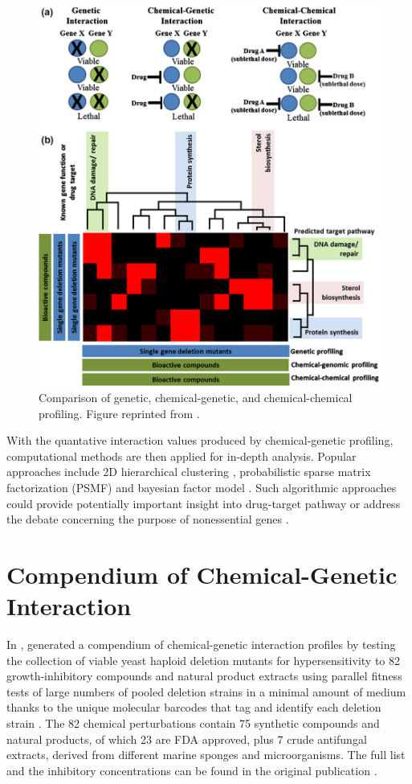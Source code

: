 \documentclass[12pt,fullpage,singlespace]{article}
\begin{document}
\begin{figure}
\centering
\includegraphics[width=\linewidth]{1082-1.png}
\caption{Comparison of genetic, chemical-genetic, and chemical-chemical profiling. Figure reprinted from \citep{1082}.}
\label{fig:1082-1}
\end{figure}

With the quantative interaction values produced by chemical-genetic profiling, computational methods are then applied for in-depth analysis. Popular approaches include 2D hierarchical clustering \citep{1078,1079,1080}, probabilistic sparse matrix factorization (PSMF) \citep{1078} and bayesian factor model \citep{1079}. Such algorithmic approaches could provide potentially important insight into drug-target pathway \citep{1078,1079} or address the debate concerning the purpose of nonessential genes \citep{1080}.

\section{Compendium of Chemical-Genetic Interaction}

In \citeyear{1078},  generated a compendium of chemical-genetic interaction profiles by testing the collection of viable yeast haploid deletion mutants for hypersensitivity to 82 growth-inhibitory compounds and natural product extracts using parallel fitness tests of large numbers of pooled deletion strains in a minimal amount of medium thanks to the unique molecular barcodes that tag and identify each deletion strain \citep{1078}. The 82 chemical perturbations contain 75 synthetic compounds and natural products, of which 23 are FDA approved, plus 7 crude antifungal extracts, derived from different marine sponges and microorganisms. The full list and the inhibitory concentrations can be found in the original publication \citep{1078}.
\end{document}
